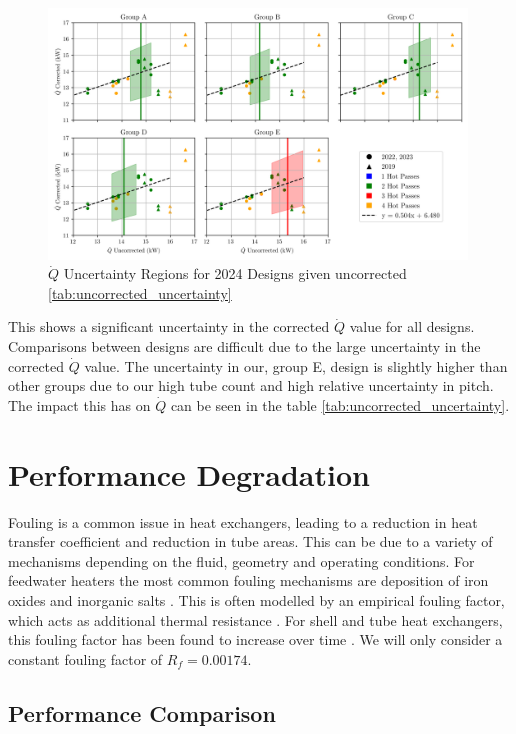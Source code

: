 \documentclass{article}
\begin{document}
\begin{figure}[H]
    \centering
    \includegraphics[width=0.99\textwidth]{Qdot_uncertainty_bands.png}
    \caption{$\dot{Q}$ Uncertainty Regions for 2024 Designs given uncorrected \ref{tab:uncorrected_uncertainty}}
    \label{fig:uncertainty_regions}
\end{figure}

This shows a significant uncertainty in the corrected $\dot{Q}$ value for all designs. Comparisons between designs are difficult due to the large uncertainty in the corrected $\dot{Q}$ value.
The uncertainty in our, group E, design is slightly higher than other groups due to our high tube count and high relative uncertainty in pitch.
The impact this has on $\dot{Q}$ can be seen in the table \ref{tab:uncorrected_uncertainty}.


\section{Performance Degradation}

Fouling is a common issue in heat exchangers, leading to a reduction in heat transfer coefficient and reduction in tube areas.
This can be due to a variety of mechanisms depending on the fluid, geometry and operating conditions.
For feedwater heaters the most common fouling mechanisms are deposition of iron oxides and inorganic salts \cite{HeatTransfer}.
This is often modelled by an empirical fouling factor, which acts as additional thermal resistance \cite{HeatTransfer}.
For shell and tube heat exchangers, this fouling factor has been found to increase over time \cite{fouling}.
We will only consider a constant fouling factor of $R_f = 0.00174$.

\subsection{Performance Comparison}
\end{document}

